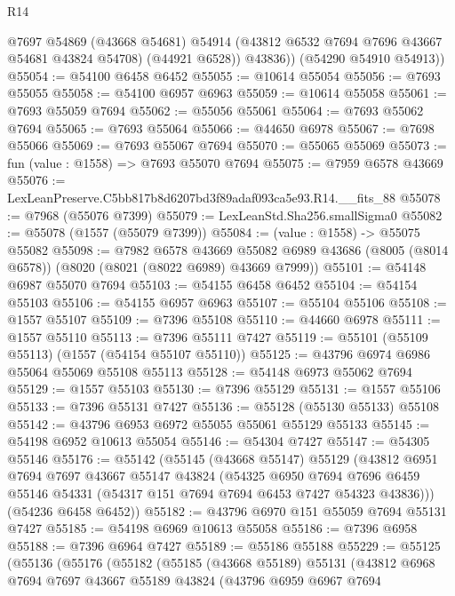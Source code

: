 \begin{lexlean}{R14}
\begin{coremodule}
            @7697
            @54869
            (@43668 @54681)
            @54914
            (@43812 @6532 @7694 @7696 @43667 @54681 @43824 @54708)
            (@44921 @6528))
          @43836))
      (@54290 @54910 @54913))
@55054 := @54100 @6458 @6452
@55055 := @10614 @55054
@55056 := @7693 @55055
@55058 := @54100 @6957 @6963
@55059 := @10614 @55058
@55061 := @7693 @55059 @7694
@55062 := @55056 @55061
@55064 := @7693 @55062 @7694
@55065 := @7693 @55064
@55066 := @44650 @6978
@55067 := @7698 @55066
@55069 := @7693 @55067 @7694
@55070 := @55065 @55069
@55073 := fun (value : @1558) => @7693 @55070 @7694
@55075 := @7959 @6578 @43669
@55076 := LexLeanPreserve.C5bb817b8d6207bd3f89adaf093ca5e93.R14.__fits_88
@55078 := @7968 (@55076 @7399)
@55079 := LexLeanStd.Sha256.smallSigma0
@55082 := @55078 (@1557 (@55079 @7399))
@55084 := (value : @1558) -> @55075 @55082
@55098 := @7982
    @6578
    @43669
    @55082
    @6989
    @43686
    (@8005 (@8014 @6578))
    (@8020 (@8021 (@8022 @6989) @43669 @7999))
@55101 := @54148 @6987 @55070 @7694
@55103 := @54155 @6458 @6452
@55104 := @54154 @55103
@55106 := @54155 @6957 @6963
@55107 := @55104 @55106
@55108 := @1557 @55107
@55109 := @7396 @55108
@55110 := @44660 @6978
@55111 := @1557 @55110
@55113 := @7396 @55111 @7427
@55119 := @55101 (@55109 @55113) (@1557 (@54154 @55107 @55110))
@55125 := @43796 @6974 @6986 @55064 @55069 @55108 @55113
@55128 := @54148 @6973 @55062 @7694
@55129 := @1557 @55103
@55130 := @7396 @55129
@55131 := @1557 @55106
@55133 := @7396 @55131 @7427
@55136 := @55128 (@55130 @55133) @55108
@55142 := @43796 @6953 @6972 @55055 @55061 @55129 @55133
@55145 := @54198 @6952 @10613 @55054
@55146 := @54304 @7427
@55147 := @54305 @55146
@55176 := @55142
    (@55145
      (@43668 @55147)
      @55129
      (@43812
        @6951
        @7694
        @7697
        @43667
        @55147
        @43824
        (@54325
          @6950
          @7694
          @7696
          @6459
          @55146
          @54331
          (@54317 @151 @7694 @7694 @6453 @7427 @54323 @43836)))
      (@54236 @6458 @6452))
@55182 := @43796 @6970 @151 @55059 @7694 @55131 @7427
@55185 := @54198 @6969 @10613 @55058
@55186 := @7396 @6958
@55188 := @7396 @6964 @7427
@55189 := @55186 @55188
@55229 := @55125
    (@55136
      (@55176
        (@55182
          (@55185
            (@43668 @55189)
            @55131
            (@43812
              @6968
              @7694
              @7697
              @43667
              @55189
              @43824
              (@43796
                @6959
                @6967
                @7694

\end{coremodule}
\end{lexlean}
